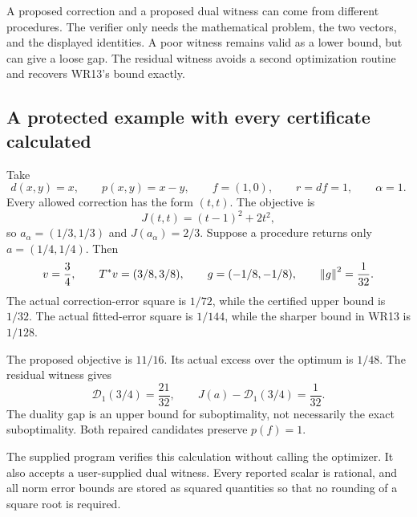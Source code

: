 A proposed correction and a proposed dual witness can come from different procedures. The verifier only needs the mathematical problem, the two vectors, and the displayed identities. A poor witness remains valid as a lower bound, but can give a loose gap. The residual witness avoids a second optimization routine and recovers WR13's bound exactly.

\subsection{A protected example with every certificate calculated}
Take
\[
 d(x,y)=x,\qquad p(x,y)=x-y,\qquad f=(1,0),\qquad r=df=1,\qquad\alpha=1.
\]
Every allowed correction has the form $(t,t)$. The objective is
\[
 J(t,t)=(t-1)^2+2t^2,
\]
so $a_\alpha=(1/3,1/3)$ and $J(a_\alpha)=2/3$. Suppose a procedure returns only $a=(1/4,1/4)$. Then
\[
 v=\frac34,\qquad T^*v=(3/8,3/8),\qquad
 g=(-1/8,-1/8),\qquad\left\lVert g\right\rVert^2=\frac1{32}.
\]
The actual correction-error square is $1/72$, while the certified upper bound is $1/32$. The actual fitted-error square is $1/144$, while the sharper bound in WR13 is $1/128$.

The proposed objective is $11/16$. Its actual excess over the optimum is $1/48$. The residual witness gives
\[
 \mathcal D_1(3/4)=\frac{21}{32},\qquad
 J(a)-\mathcal D_1(3/4)=\frac1{32}.
\]
The duality gap is an upper bound for suboptimality, not necessarily the exact suboptimality. Both repaired candidates preserve $p(f)=1$.


The supplied program  verifies this calculation without calling the optimizer. It also accepts a user-supplied dual witness. Every reported scalar is rational, and all norm error bounds are stored as squared quantities so that no rounding of a square root is required.

